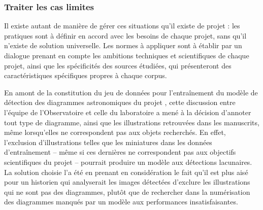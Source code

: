     \subsubsection{Traiter les cas limites}
	Il existe autant de manière de gérer ces situations qu'il existe de projet : les pratiques sont à définir en accord avec les besoins de chaque projet, sans qu'il n'existe de solution universelle. Les normes à appliquer sont à établir par un dialogue prenant en compte les ambitions techniques et scientifiques de chaque projet, ainsi que les spécificités des sources étudiées, qui présenteront des caractéristiques spécifiques propres à chaque corpus.
	
	En amont de la constitution du jeu de données pour l'entraînement du modèle de détection des diagrammes astronomiques du projet \eida, cette discussion entre l'équipe de l'Observatoire et celle du laboratoire \imagine a mené à la décision d'annoter tout type de diagramme, ainsi que les illustrations retrouvées dans les manuscrits, même lorsqu'elles ne correspondent pas aux objets recherchés. En effet, l'exclusion d'illustrations telles que les miniatures dans les données d'entraînement -- même si ces dernières ne correspondent pas aux objectifs scientifiques du projet -- pourrait produire un modèle aux détections lacunaires. La solution choisie l'a été en prenant en considération le fait qu'il est plus aisé pour un historien qui analyserait les images détectées d'exclure les illustrations qui ne sont pas des diagrammes, plutôt que de rechercher dans la numérisation des diagrammes manqués par un modèle aux performances insatisfaisantes.
	
